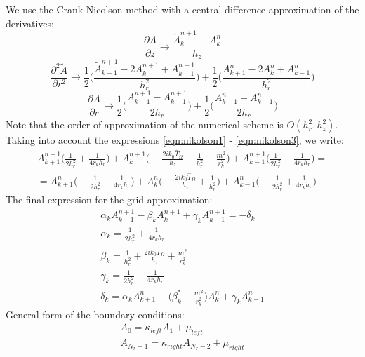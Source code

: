 \documentclass[a4paper, 12pt]{article}
\begin{document}
We use the Crank-Nicolson method with a central difference approximation of the derivatives:
\begin{equation}
\label{eqn:nikolson1}
\frac{\partial A}{\partial z} \longrightarrow \frac{\tilde{A}_k^{n+1} - A_k^{n}}{h_z}
\end{equation}
\begin{equation}
\label{eqn:nikolson2}
\frac{\partial^2 \tilde{A}}{\partial r^2} \longrightarrow \frac1{2} \biggl( \frac{\tilde{A}_{k+1}^{n+1} - 2 A_k^{n+1} + A_{k-1}^{n+1}}{h_r^2} \biggr) +
\frac1{2} \biggl( \frac{A_{k+1}^{n} - 2 A_k^{n} + A_{k-1}^{n}}{h_r^2} \biggl)
\end{equation}
\begin{equation}
\label{eqn:nikolson3}
\frac{\partial A}{\partial r} \longrightarrow \frac1{2} \biggl( \frac{A_{k+1}^{n+1} - A_{k-1}^{n+1}}{2h_r} \biggr) +
\frac1{2} \biggl( \frac{A_{k+1}^{n} - A_{k-1}^{n}}{2h_r} \biggl)
\end{equation}
Note that the order of approximation of the numerical scheme is $ O (h_r ^ 2, h_z ^ 2) $. Taking into account the expressions \eqref{eqn:nikolson1} - \eqref{eqn:nikolson3}, we write:
\begin{multline}
A_{k+1}^{n+1} \biggl( \frac1{2h_r^2} + \frac1{4 r_k h_r} \biggr) + A_{k}^{n+1} \biggl( -\frac{2 i k_0 \hat{T}_\Omega}{h_z} - \frac1{h_r^2} - \frac{m^2}{r_k^2}\biggr) + A_{k-1}^{n+1} \biggl(  \frac1{2h_r^2} - \frac1{4 r_k h_r} \biggr) =\\= A_{k+1}^{n} \biggl( -\frac1{2h_r^2} - \frac1{4 r_k h_r} \biggr) + A_{k}^{n} \biggl( -\frac{2 i k_0 \hat{T}_\Omega}{h_z} + \frac1{h_r^2} \biggr) + A_{k-1}^{n} \biggl( -\frac1{2h_r^2} + \frac1{4 r_k h_r} \biggr)
\end{multline}
The final expression for the grid approximation:
\begin{gather}
\alpha_kA_{k+1}^{n+1} - \beta_k A_{k}^{n+1} + \gamma_k A_{k-1}^{n+1} = -\delta_k\\
\alpha_k = \frac1{2h_r^2} + \frac1{4 r_k h_r}\\
\beta_k = \frac1{h_r^2} + \frac{2 i k_0 \hat{T}_\Omega}{h_z} + \frac{m^2}{r_k^2}\\
\gamma_k = \frac1{2h_r^2} - \frac1{4 r_k h_r}\\
\delta_k = \alpha_kA_{k+1}^{n} - \biggl(\beta^{*}_k - \frac{m^2}{r^2_k} \biggr) A_{k}^{n} + \gamma_k A_{k-1}^{n}
\end{gather}
General form of the boundary conditions:
\begin{gather}
A_0 = \kappa_{left} A_1 + \mu_{left}\\
A_{N_r-1} = \kappa_{right} A_{N_r-2} + \mu_{right}
\end{gather}
\end{document}
